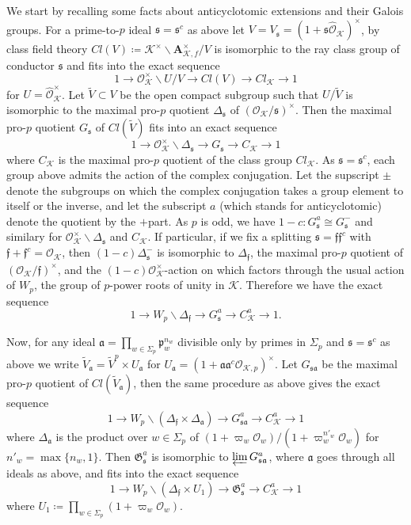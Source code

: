 \documentclass[leqno]{amsart}
\theoremstyle{definition}
\theoremstyle{remark}
\newcommand{\oo}{\mathcal{O}}
\newcommand{\A}{\mathbf A}
\newcommand{\Cl}{Cl} %
\newcommand{\fa}{\mathfrak{a}}
\newcommand{\ff}{\mathfrak{f}}
\newcommand{\fp}{\mathfrak{p}}
\newcommand{\fs}{\mathfrak{s}}
\newcommand{\K}{{\mathcal{K}}} %
\newcommand{\fG}{\mathfrak{G}}
\begin{document}
We start by recalling some facts about 
anticyclotomic extensions and their Galois groups.
For a prime-to-$p$ ideal $\fs=\fs^c$ as above
let $V=V_\fs=(1+\fs\widehat{\oo}_\K)^\times$,
by class field theory
$\Cl(V)\coloneqq \K^\times\backslash\A_{\K,f}^\times/V$
is isomorphic to the ray class group of conductor $\fs$
and fits into the exact sequence
\[
	1\to \oo_\K^\times\backslash U/V
	\to \Cl(V)\to \Cl_\K\to 1
\]
for $U=\widehat{\oo}_\K^\times$.
Let $\tilde{V}\subset V$
be the open compact subgroup
such that $U/\tilde{V}$
is isomorphic to the maximal pro-$p$ quotient
$\Delta_\fs$ of $(\oo_\K/\fs)^\times$.
Then the maximal pro-$p$ quotient $G_\fs$ of 
$\Cl(\tilde{V})$ fits into an exact sequence
\[
	1\to \oo_\K^\times\backslash \Delta_\fs
	\to G_\fs\to C_\K\to 1
\]
where $C_\K$ is the maximal pro-$p$ quotient
of the class group $\Cl_\K$.
As $\fs=\fs^c$,
each group above admits the action 
of the complex conjugation.
Let the supscript $\pm$
denote the subgroups on which 
the complex conjugation 
takes a group element
to itself or the inverse,
and let the subscript $a$
(which stands for anticyclotomic)
denote the quotient by the $+$part.
As $p$ is odd,
we have $1-c\colon G_\fs^a\cong G_\fs^-$
and similary for $\oo_\K^\times\backslash \Delta_\fs$
and $C_\K$.
If particular,
if we fix a splitting $\fs=\ff\ff^c$
with $\ff+\ff^c=\oo_\K$,
then $(1-c)\Delta_\fs^-$ is isomorphic to $\Delta_\ff$,
the maximal pro-$p$ quotient of $(\oo_\K/\ff)^\times$,
and the $(1-c)\oo_\K^\times$-action on which 
factors through the usual action of $W_p$,
the group of $p$-power roots of unity in $\K$.
Therefore we have the exact sequence
\[
    1\to W_p\backslash \Delta_\ff\to G_\fs^a\to C_\K^a\to 1.
\]

Now, for any ideal 
$\fa=\prod_{w\in\Sigma_p}\fp_w^{n_w}$
divisible only by primes in $\Sigma_p$
and $\fs=\fs^c$ as above
we write $\tilde{V}_\fa=\tilde{V}^p\times U_\fa$
for $U_\fa=(1+\fa\fa^c\oo_{\K,p})^\times$.
Let $G_{\fs\fa}$
be the maximal pro-$p$ quotient of $\Cl(\tilde{V}_\fa)$,
then the same procedure as above gives
the exact sequence
\[
    1\to W_p\backslash(\Delta_\ff\times\Delta_\fa)\to 
    G_{\fs\fa}^a\to C_\K^a\to 1
\]
where $\Delta_\fa$ is the product over $w\in\Sigma_p$
of $(1+\varpi_w\oo_w)/(1+\varpi_w^{n'_w}\oo_w)$
for $n'_w=\max\{n_w,1\}$.
Then $\fG_\fs^a$ is isomorphic to $\varprojlim G_{\fs\fa}^a$,
where $\fa$ goes through all ideals as above,
and fits into the exact sequence
\[
    1\to W_p\backslash(\Delta_\ff\times U_1)\to 
    \fG_{\fs}^a\to C_\K^a\to 1
\]
where $U_1\coloneq\prod_{w\in\Sigma_p}(1+\varpi_w\oo_w)$.
\end{document}
